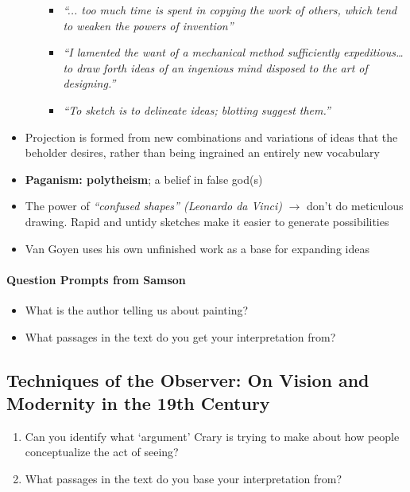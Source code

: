 \documentclass[a4paper]{article}
\begin{document}
\begin{itemize}
\begin{itemize}[label=$\circ$]
		\begin{itemize}[label=\tiny$\blacksquare$]
			\item \textit{“... too much time is spent in copying the work of others, which tend to weaken the powers of invention”}
			\item \textit{“I lamented the want of a mechanical method sufficiently expeditious… to draw forth ideas of an ingenious mind disposed to the art of designing.”}
			\item \textit{“To sketch is to delineate ideas; blotting suggest them.”}
		\end{itemize}
	\end{itemize}
	\item Projection is formed from new combinations and variations of ideas that the beholder desires, rather than being ingrained an entirely new vocabulary
	\item \textbf{Paganism: polytheism}; a belief in false god(s)
	\item The power of \textit{``confused shapes'' (Leonardo da Vinci)} $\rightarrow$ don’t do meticulous drawing. Rapid and untidy sketches make it easier to generate possibilities
	\item Van Goyen uses his own unfinished work as a base for expanding ideas 
\end{itemize}


\paragraph{Question Prompts from Samson}
\begin{itemize}
	\item What is the author telling us about painting? 
	\item What passages in the text do you get your interpretation from?
\end{itemize}

\subsection{Techniques of the Observer: On Vision and Modernity in the 19th Century}
\begin{enumerate}
	\item Can you identify what ‘argument’ Crary is trying to make about how people conceptualize the act of seeing?
	\item What passages in the text do you base your interpretation from?
\end{enumerate}
\end{document}
